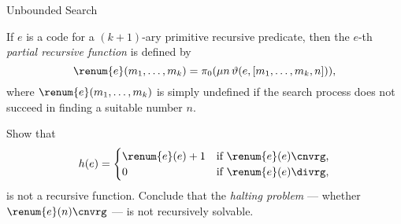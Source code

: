 \begin{unit}{Unbounded Search}
\begin{definition}
  If \(e\) is a code for a \((k+1)\)-ary primitive recursive predicate, then the \(e\)-th \emph{partial recursive function} is defined by \[\renum{e}(m_1,\dots,m_k) = \pi_0(\mu n\,\vartheta(e,[m_1,\dots,m_k,n])),\] where \(\renum{e}(m_1,\dots,m_k)\) is simply undefined if the search process does not succeed in finding a suitable number \(n.\)
\end{definition}


\begin{problem}
  Show that \[h(e) = \begin{cases}
    \renum{e}(e) + 1 & \text{if $\renum{e}(e)\cnvrg$,} \\
    0 & \text{if $\renum{e}(e)\divrg$,} 
  \end{cases}\] is not a recursive function.
  Conclude that the \emph{halting problem} --- whether \(\renum{e}(n)\cnvrg\) --- is not recursively solvable.
\end{problem}

\end{unit}
\endinput
